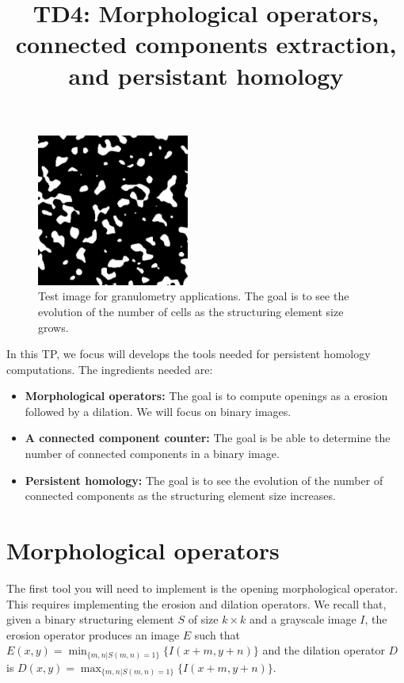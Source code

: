 \documentclass[a4paper, 11pt, french]{article}
\title{\bf{TD4: Morphological operators, connected components extraction, and persistant homology}}
\author{}
\date{}
\begin{document}
\maketitle

\begin{figure}[ht]
	\begin{center}
	\includegraphics[width=5cm]{cells.png}
	\caption{Test image for granulometry applications. The goal is to see the evolution of the number of cells as the structuring element size grows.}
	\end{center}
\end{figure} 

\par In this TP, we focus will develops the tools needed for persistent homology computations. The ingredients needed are:
\begin{itemize}
\item \textbf{Morphological operators:} The goal is to compute openings as a erosion followed by a dilation. We will focus on binary images.
 \item \textbf{A connected component counter:} The goal is be able to determine the number of connected components in a binary image.
 \item \textbf{Persistent homology:} The goal is to see the evolution of the number of connected components as the structuring element size increases.
\end{itemize}

\section*{Morphological operators}

The first tool you will need to implement is the opening morphological operator. This requires implementing the erosion and dilation operators. We recall that, given a binary structuring element $S$ of size $k \times k$ and a grayscale image $I$, the erosion operator produces an image $E$ such that $E(x,y) = \min_{\{m,n | S(m,n)=1\}} \{I(x+m, y+n)\}$ and the dilation operator $D$ is $D(x,y) = \max_{\{m,n | S(m,n)=1\}} \{I(x+m, y+n)\}$.
\end{document}
